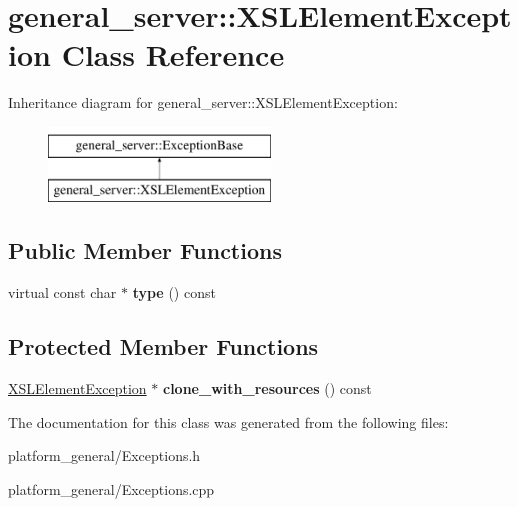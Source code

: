 \hypertarget{classgeneral__server_1_1XSLElementException}{\section{general\-\_\-server\-:\-:\-X\-S\-L\-Element\-Exception \-Class \-Reference}
\label{classgeneral__server_1_1XSLElementException}
}
\-Inheritance diagram for general\-\_\-server\-:\-:\-X\-S\-L\-Element\-Exception\-:\begin{figure}[H]
\begin{center}
\leavevmode
\includegraphics[height=2.000000cm]{classgeneral__server_1_1XSLElementException}
\end{center}
\end{figure}
\subsection*{\-Public \-Member \-Functions}
\begin{DoxyCompactItemize}
\item 
\hypertarget{classgeneral__server_1_1XSLElementException_a2e97430c3ab6c7775e9f0ef80b092b00}{virtual const char $\ast$ {\bfseries type} () const }\label{classgeneral__server_1_1XSLElementException_a2e97430c3ab6c7775e9f0ef80b092b00}

\end{DoxyCompactItemize}
\subsection*{\-Protected \-Member \-Functions}
\begin{DoxyCompactItemize}
\item 
\hypertarget{classgeneral__server_1_1XSLElementException_a08606246dd900f252f3c03189cf7ef70}{\hyperlink{classgeneral__server_1_1XSLElementException}{\-X\-S\-L\-Element\-Exception} $\ast$ {\bfseries clone\-\_\-with\-\_\-resources} () const }\label{classgeneral__server_1_1XSLElementException_a08606246dd900f252f3c03189cf7ef70}

\end{DoxyCompactItemize}


\-The documentation for this class was generated from the following files\-:\begin{DoxyCompactItemize}
\item 
platform\-\_\-general/\-Exceptions.\-h\item 
platform\-\_\-general/\-Exceptions.\-cpp\end{DoxyCompactItemize}
